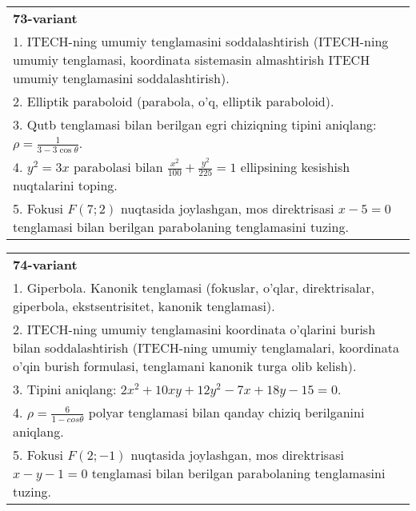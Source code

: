 \documentclass{article}
\begin{document}
\begin{tabular}{m{17cm}}
\textbf{73-variant}\\
1. ITECH-ning umumiy tenglamasini soddalashtirish (ITECH-ning umumiy tenglamasi, koordinata sistemasin almashtirish ITECH umumiy tenglamasini soddalashtirish).\\

2. Elliptik paraboloid (parabola, o'q, elliptik paraboloid).\\

3. Qutb tenglamasi bilan berilgan egri chiziqning tipini aniqlang: $\rho=\frac{1}{3-3\cos\theta}$.\\

4. $y^{2} = 3x$ parabolasi bilan $\frac{x^{2}}{100} + \frac{y^{2}}{225} = 1$ ellipsining kesishish nuqtalarini toping.  \\

5. Fokusi $F(7;2)$ nuqtasida joylashgan, mos direktrisasi $x - 5 = 0$ tenglamasi bilan berilgan parabolaning tenglamasini tuzing.  
\end{tabular}
\vspace{1cm}


\begin{tabular}{m{17cm}}
\textbf{74-variant}\\
1. Giperbola. Kanonik tenglamasi (fokuslar, o'qlar, direktrisalar, giperbola, ekstsentrisitet, kanonik tenglamasi).\\

2. ITECH-ning umumiy tenglamasini koordinata o'qlarini burish bilan soddalashtirish (ITECH-ning umumiy tenglamalari, koordinata o'qin burish formulasi, tenglamani kanonik turga olib kelish).\\

3. Tipini aniqlang: $2x^{2}+10xy+12y^{2}-7x+18y-15=0$.\\

4. $\rho = \frac{6}{1 - cos\theta}$ polyar tenglamasi bilan qanday chiziq berilganini aniqlang.  \\

5. Fokusi $F(2; - 1)$ nuqtasida joylashgan, mos direktrisasi $x - y - 1 = 0$ tenglamasi bilan berilgan parabolaning tenglamasini tuzing.  
\end{tabular}
\vspace{1cm}
\end{document}
